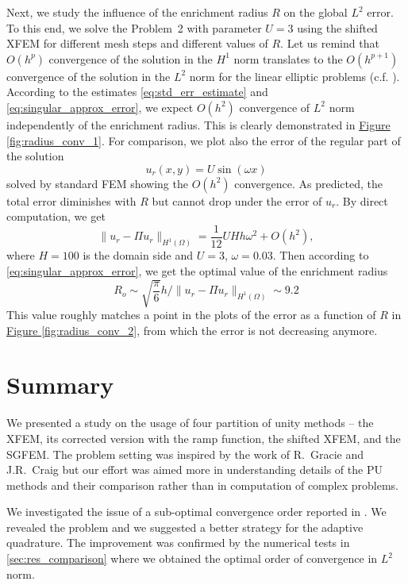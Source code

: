 \documentclass{elsarticle}
\newcommand{\prob}[1]{Problem~{#1}}
\newcommand{\fig}[1]{\hyperref[#1]{Figure \ref{#1}}}
\def\norm#1{\| #1 \|}
\begin{document}
Next, we study the influence of the enrichment radius $R$ on the global $L^2$ error. To this end, we solve the \prob{2} with parameter $U=3$
using the shifted XFEM for different mesh steps and different values of $R$.
Let us remind that $O(h^p)$ convergence of the solution in the $H^1$ norm translates to the $O(h^{p+1})$ convergence of the solution in the $L^2$ norm 
for the linear elliptic problems (c.f. \cite[Theorem 19.2]{ciarlet_basic_1991}). According to the estimates \eqref{eq:std_err_estimate}
and \eqref{eq:singular_approx_error}, we expect $O(h^2)$ convergence of $L^2$ norm independently of the enrichment radius. This is 
clearly demonstrated in \fig{fig:radius_conv_1}. For comparison, we plot also the error of the regular part of the solution
\[
  u_r(x,y) = U \sin (\omega x)
\]
solved by standard FEM showing the $O(h^2)$ convergence.
As predicted, the total error diminishes with $R$ but cannot 
drop under the error of $u_r$. By direct computation, we get
\[
  \norm{u_r - \Pi u_r}_{H^1(\Omega)} = \frac{1}{12}UHh\omega^2 + O(h^2),
\]
where $H=100$ is the domain side and $U=3$, $\omega=0.03$. Then according to \eqref{eq:singular_approx_error},
we get the optimal value of the enrichment radius
\[
    R_o \sim \sqrt{\frac{\pi}{6}} h/\norm{u_r - \Pi u_r}_{H^1(\Omega)} \sim 9.2
\]
This value roughly matches a point in the plots of the error as a function of $R$ in
\fig{fig:radius_conv_2}, from which the error is not decreasing anymore.





\section{Summary}
\label{sec:summary}

We presented a study on the usage of four partition of unity methods -- the XFEM, its corrected version with the ramp 
function, the shifted XFEM, and the SGFEM. The problem setting was inspired by the work \cite{gracie_modelling_2010,craig_using_2011} 
of R.~Gracie and J.R.~Craig but our effort was aimed more in understanding details of the PU methods and their comparison
rather than in computation of complex problems.

We investigated the issue of a sub-optimal convergence order reported in \cite{gracie_modelling_2010}. We revealed the problem
and we suggested a better strategy for the adaptive quadrature. The improvement was confirmed by the numerical
tests in \ref{sec:res_comparison} where we obtained the optimal order of convergence in $L^2$ norm.
\end{document}
